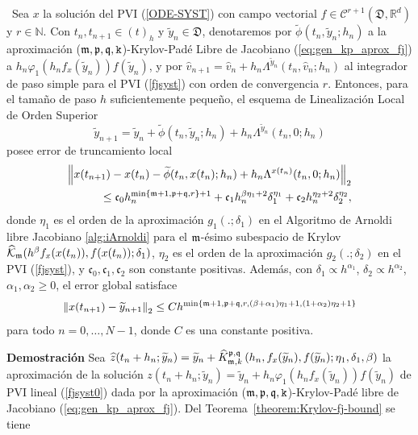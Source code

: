 \begin{theorem}\label{theorem:kp-fj-llrk-convergence}
	\cite{naranjo2023jacobian}~Sea $x$ la solución del PVI (\ref{ODE-SYST}) con campo vectorial $f\in \mathcal{C}^{r+1}(\mathfrak{D}, \mathbb{R}^d)$ y $r \in \mathbb{N}$.
	Con $t_n,t_{n+1}\in (t)_h$ y $\widetilde{y}_n \in \mathfrak{D}$, denotaremos por $\widetilde{\phi}(t_n,\widetilde{y}_n;h_n)$ a la aproximación ($\mathfrak{m},\mathfrak{p},\mathfrak{q},\mathtt{k}$)-Krylov-Padé Libre de Jacobiano (\ref{eq:gen_kp_aprox_fj}) a $h_n\varphi_1(h_nf_x(\widetilde{y}_n))f(\widetilde{y}_n)$, 
	y por $\widehat{v}_{n+1}=\widehat{v}_n+h_n\Lambda^{\widetilde{y}_n}(t_n,\widehat{v}_n;h_n)$ al integrador de paso simple para el PVI (\ref{fjsyst}) con orden de convergencia $r$. Entonces, para el tamaño de paso $h$ suficientemente pequeño, el esquema de Linealización Local de Orden Superior
	\begin{equation}
	\widetilde{y}_{n+1}= \widetilde{y}_n+\widetilde{\phi}(t_n,\widetilde{y}_n;h_n)+h_n\Lambda^{\widetilde{y}_n}(t_n,0;h_n) \label{JFKPHOLL}
	\end{equation}
	posee error de truncamiento local
	\begin{align}
	\left\lVert x(t_{n+1})-x(t_n)-\widetilde{\phi}(t_n,x(t_n);h_n)+h_n\Lambda^{x(t_n)}(t_n,0;h_n) \right\rVert_2 \\ \leq \mathfrak{c}_0h_n^{\min\{\mathfrak{m}+1,\mathfrak{p}+\mathfrak{q},r \}+1} + \mathfrak{c}_1h_n^{\beta\eta_1+2}\delta_1^{\eta_1} + \mathfrak{c}_2h_n^{\eta_2+2}\delta_2^{\eta_2}, \nonumber
	\end{align}
	donde $\eta_1$ es el orden de la aproximación $g_1(.;\delta_1)$ en el Algoritmo de Arnoldi libre Jacobiano \ref{alg:iArnoldi} para el $\mathfrak{m}$-ésimo subespacio de Krylov $\widehat{\mathcal{K}}_{\mathfrak{m}}(h^\beta f_x(x(t_n)),f(x(t_n));\delta_1)$, $\eta_2$  es el orden de la aproximación $g_2(.;\delta_2)$ en el PVI (\ref{fjsyst}), y $\mathfrak{c}_0,\mathfrak{c}_1,\mathfrak{c}_2$ son constante positivas. 
	Además, con $\delta_1\propto h^{\alpha_1}$, $\delta_2\propto h^{\alpha_2}$, $\alpha_1,\alpha_2 \geq 0$, el error global satisface
	\[ \left\lVert x(t_{n+1})-\widetilde{y}_{n+1} \right\rVert_2\leq Ch^{\min\{\mathfrak{m}+1,\mathfrak{p}+\mathfrak{q},r,(\beta+\alpha_1)\eta_1+1,(1+\alpha_2)\eta_2+1\}} \]
	para todo $n=0,\ldots,N-1$, donde $C$ es una constante positiva.
\end{theorem}
\textbf{Demostración} Sea $\widehat{z}(t_n+h_n;\widetilde{y}_n)=\widetilde{y}_n+\widehat{K}_{\mathfrak{m},k}^{\mathfrak{p},\mathfrak{q}}\left(h_n,f_x(\widetilde{y}_n), f(\widetilde{y}_n); \eta_1, \delta_1, \beta \right)$ la aproximación de la solución $z(t_n+h_n;\widetilde{y}_n)=\widetilde{y}_n+h_n\varphi_1(h_nf_x(\widetilde{y}_n))f(\widetilde{y}_n)$ de PVI lineal (\ref{fjsyst0}) dada por la aproximación ($\mathfrak{m},\mathfrak{p},\mathfrak{q},\mathtt{k}$)-Krylov-Padé libre de Jacobiano  (\ref{eq:gen_kp_aprox_fj}). Del Teorema~\ref{theorem:Krylov-fj-bound} se tiene
